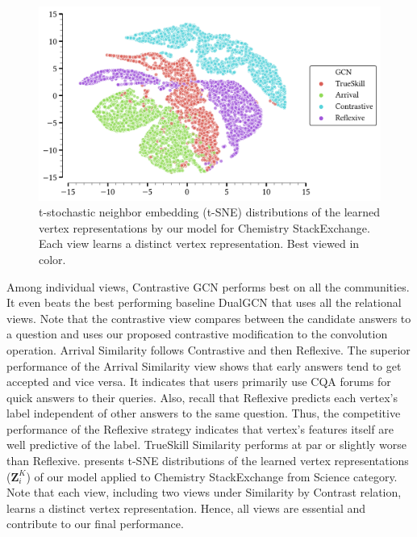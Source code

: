 \begin{figure}
  \centering
    \vspace{-0.12in}
  \includegraphics[scale=0.3]{figures/sne_plot.pdf}
  \caption{\small \label{fig:sne} t-stochastic neighbor embedding (t-SNE) \cite{sne} distributions of the learned vertex representations by our model for Chemistry StackExchange. Each view learns a distinct vertex representation. Best viewed in color.}
  \vspace{-0.1in}
\end{figure}

Among individual views, Contrastive GCN performs best on all the communities. It even beats the best performing baseline DualGCN that uses all the relational views. Note that the contrastive view compares between the candidate answers to a question and uses our proposed contrastive modification to the convolution operation. Arrival Similarity follows Contrastive and then Reflexive. The superior performance of the Arrival Similarity view shows that early answers tend to get accepted and vice versa. It indicates that users primarily use CQA forums for quick answers to their queries. Also, recall that Reflexive predicts each vertex's label independent of other answers to the same question. Thus, the competitive performance of the Reflexive strategy indicates that vertex's features itself are well predictive of the label. TrueSkill Similarity performs at par or slightly worse than Reflexive.  presents t-SNE distributions \cite{sne} of the learned vertex representations ($\mathbf{Z}_i^K$) of our model applied to Chemistry StackExchange from Science category. Note that each view, including two views under Similarity by Contrast relation, learns a distinct vertex representation. Hence, all views are essential and contribute to our final performance.

